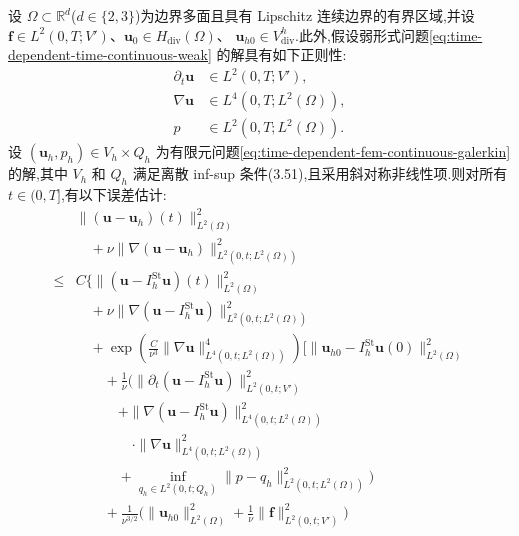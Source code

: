 \begin{theorem}
\label{thm:time-dependent-fem-velocity-error}
设 $\Omega\subset\mathbb{R}^d$($d\in\{2,3\}$)为边界多面且具有 Lipschitz 连续边界的有界区域,并设
$\bm{f}\in L^2(0,T;V')$、$\bm{u}_0\in H_{\mathrm{div}}(\Omega)$、
$\bm{u}_{h0}\in V_{\mathrm{div}}^h$.此外,假设弱形式问题\cref{eq:time-dependent-time-continuous-weak} 的解具有如下正则性:
\begin{equation}\label{eq:time-dependent-fem-error-regularity}
\begin{aligned}
  \partial_t\bm{u}&\in L^2(0,T;V'),\\
  \nabla\bm{u}&\in L^4(0,T;L^2(\Omega)),\\
  p&\in L^2(0,T;L^2(\Omega)).
\end{aligned}
\end{equation}
设 $(\bm{u}_h,p_h)\in V_h\times Q_h$ 为有限元问题\cref{eq:time-dependent-fem-continuous-galerkin} 的解,其中 $V_h$ 和 $Q_h$ 满足离散 inf-sup 条件(3.51),且采用斜对称非线性项.则对所有 $t\in(0,T]$,有以下误差估计:
\begin{equation}\label{eq:time-dependent-fem-velocity-error}
\begin{aligned}
  &\|(\bm{u}-\bm{u}_h)(t)\|_{L^2(\Omega)}^2\\
  &\quad+\nu\|\nabla(\bm{u}-\bm{u}_h)\|_{L^2(0,t;L^2(\Omega))}^2\\
  \le{}&C\Biggl\{
    \|(\bm{u}-I_h^{\mathrm{St}}\bm{u})(t)\|_{L^2(\Omega)}^2\\
  &\quad+\nu\|\nabla(\bm{u}-I_h^{\mathrm{St}}\bm{u})\|_{L^2(0,t;L^2(\Omega))}^2\\
  &\quad+\exp\!\left(
      \frac{C}{\nu^3}
      \|\nabla\bm{u}\|_{L^4(0,t;L^2(\Omega))}^4
    \right)\Biggl[
      \|\bm{u}_{h0}-I_h^{\mathrm{St}}\bm{u}(0)\|_{L^2(\Omega)}^2\\
  &\qquad+\frac{1}{\nu}\Biggl(
      \|\partial_t(\bm{u}-I_h^{\mathrm{St}}\bm{u})\|_{L^2(0,t;V')}^2\\
  &\qquad\quad+
      \|\nabla(\bm{u}-I_h^{\mathrm{St}}\bm{u})\|_{L^4(0,t;L^2(\Omega))}^2\\
  &\qquad\qquad\cdot\|\nabla\bm{u}\|_{L^4(0,t;L^2(\Omega))}^2\\
  &\qquad\quad+
      \inf_{q_h\in L^2(0,t;Q_h)}
        \|p-q_h\|_{L^2(0,t;L^2(\Omega))}^2
    \Biggr)\\
  &\qquad+\frac{1}{\nu^{3/2}}\Biggl(
      \|\bm{u}_{h0}\|_{L^2(\Omega)}^2
      +\frac{1}{\nu}\|\bm{f}\|_{L^2(0,t;V')}^2
    \Biggr)\\

\end{aligned}
\end{equation}
\end{theorem}
